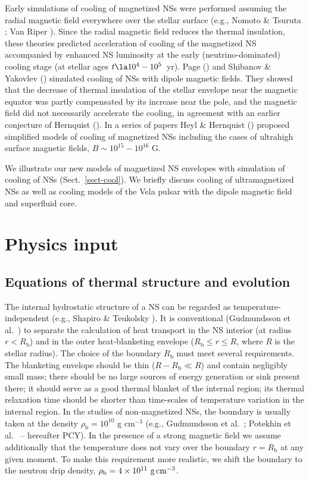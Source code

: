 \documentclass{aa}
\begin{document}
Early simulations of cooling of magnetized NSs
were performed assuming the radial magnetic field
everywhere over the stellar surface
(e.g., Nomoto \& Tsuruta \cite{nt87}; Van Riper \cite{kvr91}).
Since the radial magnetic field reduces the thermal insulation,
these theories predicted acceleration of cooling
of the magnetized NS accompanied by enhanced
NS luminosity at the early (neutrino-dominated) cooling stage
(at stellar ages $t \la 10^4 - 10^5$~yr).
Page (\cite{page95}) and
Shibanov \& Yakovlev (\cite{shibyak}) simulated cooling
of NSs with dipole magnetic fields.
They showed that the decrease of thermal
insulation of the stellar envelope near the magnetic
equator was partly compensated by its increase near the pole,
and the magnetic field did not necessarily accelerate the cooling,
in agreement with an earlier conjecture of Hernquist (\cite{hern85}).
In a series of papers Heyl \& Hernquist
(\cite{HH97,HH97b,hh-theory,hh-multi}) proposed simplified
models of cooling of magnetized NSs including the cases
of ultrahigh surface magnetic fields, $B \sim 10^{15}-10^{16}$ G.

We illustrate our new models of magnetized NS envelopes
with simulation of cooling of NSs (Sect.\ \ref{sect-cool}).
We briefly discuss
cooling of ultramagnetized NSs as well as cooling models
of the Vela pulsar with the dipole magnetic field and
superfluid core.

\section{Physics input}
\label{sect-input}
%
\subsection{Equations of thermal structure and evolution}
%
The internal hydrostatic structure of a NS can be regarded as
temperature-independent (e.g., Shapiro \& Teukolsky \cite{ST83}).  
It is conventional (Gudmundsson et al.\ \cite{gpe83}) to separate the
calculation of heat transport in the NS interior
(at radius $r < R_\mathrm{b}$)
and in the outer heat-blanketing envelope
($R_\mathrm{b} \leq r \leq R$, where
$R$ is the stellar radius). The choice of the boundary
$R_\mathrm{b}$ must meet several requirements.
The blanketing envelope should be thin
($R-R_\mathrm{b} \ll R$) and contain negligibly small mass;
there should be no large sources of energy generation or sink 
present there;
it should serve as a good thermal blanket of
the internal region; its thermal relaxation time should
be shorter than time-scales of temperature variation
in the internal region. 
In the studies of non-magnetized NSs,
the boundary is usually taken at 
the density $\rho_\mathrm{b}=10^{10}$ g cm$^{-3}$
(e.g., Gudmundsson et al.\ \cite{gpe83}; Potekhin et al.\ \cite{pcy97}
-- hereafter PCY).
In the presence of a strong magnetic field
we assume
additionally that
the temperature
does not vary over the boundary $r=R_\mathrm{b}$
at any given moment.
To make this requirement more realistic,
we shift the boundary to the neutron drip density,
$\rho_\mathrm{b}=4\times10^{11}\mbox{~g\,cm$^{-3}$}$.
\end{document}

